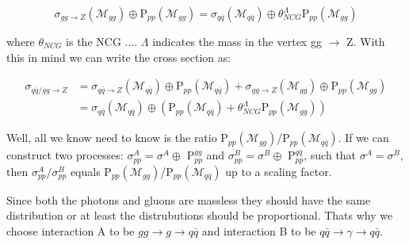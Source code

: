 \begin{equation}
\sigma_{gg\rightarrow Z} (\mathcal{M}_{gg}) \oplus \textrm{P}_{pp}(\mathcal{M}_{gg})=\sigma_{q \bar q}(\mathcal{M}_{q \bar q}) \oplus \theta_{NCG}^{\Lambda}\textrm{P}_{pp}(\mathcal{M}_{gg})
\end{equation}

where $\theta_{NCG}$ is the NCG .... $\Lambda$ indicates the mass in the vertex gg $\rightarrow$ Z. With this in mind we can write the cross section as:

\begin{align}
\sigma_{q \bar q/gg \rightarrow Z} &= \sigma_{q \bar q \rightarrow Z} (\mathcal{M}_{q \bar q}) \oplus \textrm{P}_{pp}(\mathcal{M}_{q \bar q})+ \sigma_{gg\rightarrow Z} (\mathcal{M}_{gg}) \oplus \textrm{P}_{pp}(\mathcal{M}_{gg})\nonumber \\ 
&= \sigma_{q \bar q}(\mathcal{M}_{q \bar q}) \oplus (\textrm{P}_{pp}(\mathcal{M}_{q \bar q})+\theta_{NCG}^{\Lambda}\textrm{P}_{pp}(\mathcal{M}_{gg}))
\end{align}

Well, all we know need to know is the ratio P$_{pp}(\mathcal{M}_{gg})$/P$_{pp}(\mathcal{M}_{q \bar q})$. If we can construct two processes: $\sigma_{pp}^{A}=\sigma^{A} \oplus$ P$_{pp}^{gg}$ and $\sigma_{pp}^{B}=\sigma^{B} \oplus$ P$_{pp}^{q \bar q}$, such that $\sigma^{A}=\sigma^{B}$, then $\sigma_{pp}^{A}/\sigma_{pp}^{B}$ equals  P$_{pp}(\mathcal{M}_{gg})$/P$_{pp}(\mathcal{M}_{q \bar q})$ up to a scaling factor.

Since both the photons and gluons are massless they should have the same distribution or at least the distrubutions should be proportional. Thats why we choose interaction A to be $gg \rightarrow g \rightarrow q \bar q$ and interaction B to be $q \bar q \rightarrow \gamma \rightarrow q \bar q$.



